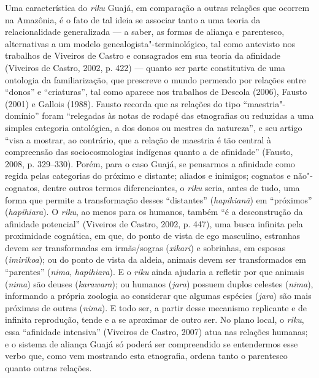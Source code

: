 Uma característica do \emph{riku} Guajá, em comparação a outras relações
que ocorrem na Amazônia, é o fato de tal ideia se associar tanto a uma
teoria da relacionalidade generalizada --- a saber, as formas de aliança e
parentesco, alternativas a um modelo genealogista"-terminológico, tal
como antevisto nos trabalhos de Viveiros de Castro e consagrados em sua
teoria da afinidade (Viveiros de Castro, 2002, p. 422) --- quanto ser
parte constitutiva de uma ontologia da familiarização, que prescreve o
mundo permeado por relações entre ``donos'' e ``criaturas'', tal como
aparece nos trabalhos de Descola (2006), Fausto (2001) e Gallois (1988).
Fausto recorda que as relações do tipo ``maestria"-domínio'' foram
``relegadas às notas de rodapé das etnografias ou reduzidas a uma simples
categoria ontológica, a dos donos ou mestres da natureza'', e seu artigo
``visa a mostrar, ao contrário, que a relação de maestria é tão central à
compreensão das sociocosmologias indígenas quanto a de afinidade''
(Fausto, 2008, p. 329--330). Porém, para o caso Guajá, se pensarmos a
afinidade como regida pelas categorias do próximo e distante; aliados e
inimigos; cognatos e não"-cognatos, dentre outros termos diferenciantes,
o \emph{riku} seria, antes de tudo, uma forma que permite a
transformação desses ``distantes'' (\emph{hapihianã}) em ``próximos''
(\emph{hapihiara}). O \emph{riku}, ao menos para os humanos, também ``é a
desconstrução da afinidade potencial'' (Viveiros de Castro, 2002, p.
447), uma busca infinita pela proximidade cognática, em que, do ponto de
vista de ego masculino, estranhas devem ser transformadas em
irmãs/sogras (\emph{xikari}) e sobrinhas, em esposas (\emph{imirikoa});
ou do ponto de vista da aldeia, animais devem ser transformados em
``parentes'' (\emph{nima}, \emph{hapihiara}). E o \emph{riku} ainda
ajudaria a refletir por que animais (\emph{nima}) são deuses
(\emph{karawara}); ou humanos (\emph{jara}) possuem duplos celestes
(\emph{nima}), informando a própria zoologia ao considerar que algumas
espécies (\emph{jara}) são mais próximas de outras (\emph{nima}). E todo
ser, a partir desse mecanismo replicante e de infinita reprodução, tende
e a se aproximar de outro ser. No plano local, o \emph{riku}, essa
``afinidade intensiva'' (Viveiros de Castro, 2007) atua nas relações
humanas; e o sistema de aliança Guajá só poderá ser compreendido se
entendermos esse verbo que, como vem mostrando esta etnografia, ordena
tanto o parentesco quanto outras relações.

